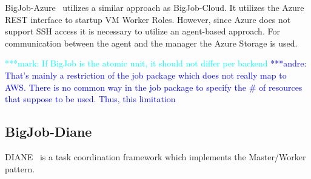 \documentclass[]{article}
\newcommand{\alnote}[1]{ {\textcolor{blue} { ***andre: #1 }}}
\newcommand{\msnote}[1]{ {\textcolor{cyan} { ***mark: #1 }}}
\newcommand{\alnote}[1]{}
\begin{document}
BigJob-Azure~\cite{10.1109/CloudCom.2010.85} utilizes a similar approach as
BigJob-Cloud. It utilizes the Azure REST interface to startup VM Worker Roles.
However, since Azure does not support SSH access it is necessary to utilize an
agent-based approach. For communication between the agent and the manager the
Azure Storage is used.

\msnote{If BigJob is the atomic unit, it should not differ per
backend}\alnote{That's mainly a restriction of the job package which does not
really map to AWS. There is no common way in the job package to specify the \#
of resources that suppose to be used. Thus, this limitation}


\subsection{BigJob-Diane}


DIANE~\cite{Moscicki:908910} is a task coordination framework which implements 
the Master/Worker pattern. 
\end{document}
